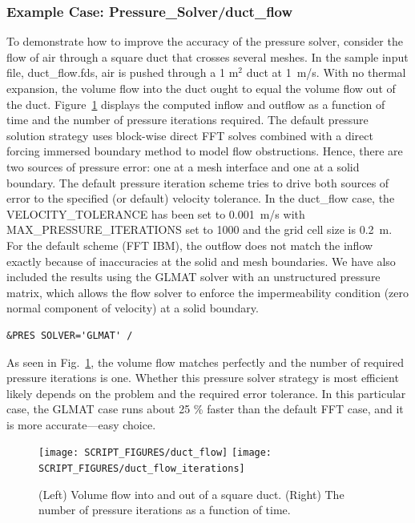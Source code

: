 \documentclass[11pt]{book}
\begin{document}
\subsubsection{Example Case: Pressure\_Solver/duct\_flow}
\label{duct_flow}

To demonstrate how to improve the accuracy of the pressure solver, consider the flow of air through a square duct that crosses several meshes. In the sample input file, {\ct duct\_flow.fds}, air is pushed through a 1 m$^2$ duct at 1~m/s. With no thermal expansion, the volume flow into the duct ought to equal the volume flow out of the duct. Figure~\ref{duct_flow_fig} displays the computed inflow and outflow as a function of time and the number of pressure iterations required. The default pressure solution strategy uses block-wise direct FFT solves combined with a direct forcing immersed boundary method to model flow obstructions.  Hence, there are two sources of pressure error: one at a mesh interface and one at a solid boundary.  The default pressure iteration scheme tries to drive both sources of error to the specified (or default) velocity tolerance. In the {\ct duct\_flow} case, the {\ct VELOCITY\_TOLERANCE} has been set to 0.001~m/s with {\ct MAX\_PRESSURE\_ITERATIONS} set to 1000 and the grid cell size is 0.2~m.  For the default scheme (FFT IBM), the outflow does not match the inflow exactly because of inaccuracies at the solid and mesh boundaries.  We have also included the results using the GLMAT solver with an unstructured pressure matrix, which allows the flow solver to enforce the impermeability condition (zero normal component of velocity) at a solid boundary.
\begin{lstlisting}
&PRES SOLVER='GLMAT' /
\end{lstlisting}
As seen in Fig.~\ref{duct_flow_fig}, the volume flow matches perfectly and the number of required pressure iterations is one.  Whether this pressure solver strategy is most efficient likely depends on the problem and the required error tolerance.  In this particular case, the GLMAT case runs about 25 \% faster than the default FFT case, and it is more accurate---easy choice.

\begin{figure}[ht]
\begin{center}
\texttt{[image: SCRIPT\_FIGURES/duct\_flow]}
\texttt{[image: SCRIPT\_FIGURES/duct\_flow\_iterations]}
\end{center}
\caption[Results of the {\ct duct\_flow} test case]{(Left) Volume flow into and out of a square duct. (Right) The number of pressure iterations as a function of time.}
\label{duct_flow_fig}
\end{figure}
\end{document}
